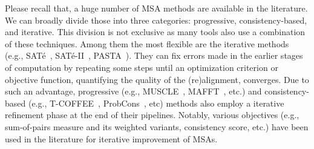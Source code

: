 Please recall that, a huge number of MSA methods are available in the literature. We can broadly divide those into three categories: progressive, consistency-based, and iterative. This division is not exclusive as many tools also use a combination of these techniques. Among them the most flexible are the iterative methods (e.g., SAT\'e~\cite{liu2009rapid}, SAT\'e-II~\cite{liu2012sate}, PASTA~\cite{mirarab2015pasta}). They can fix errors made in the earlier stages of computation by repeating some steps until an optimization criterion or objective function, quantifying the quality of the (re)alignment, converges. Due to such an advantage, progressive (e.g., MUSCLE~\cite{edgar2004muscle}, MAFFT~\cite{katoh2002mafft}, etc.) and consistency-based (e.g., T-COFFEE~\cite{notredame2000t}, ProbCons~\cite{do2005probcons}, etc) methods also employ a iterative refinement phase at the end of their pipelines. Notably, various objectives (e.g., sum-of-pairs measure and its weighted variants, consistency score, etc.) have been used in the literature for iterative improvement of MSAs.

 


